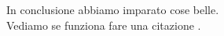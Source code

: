 
In conclusione abbiamo imparato cose belle.\\
Vediamo se funziona fare una citazione \parencite{pippo}.
\lipsum